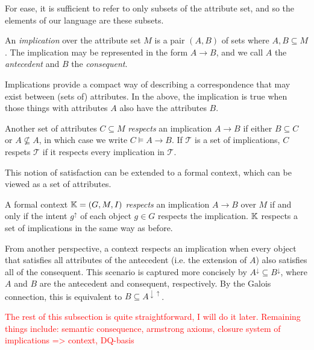 For ease, it is sufficient to refer to only subsets of the attribute set, and so the elements of our language are these subsets.

\begin{definition}
	\label{definition:implication}

	An \emph{implication} over the attribute set $M$ is a pair $(A,B)$ of sets where $A,B \subseteq M$. The implication
	may be represented in the form $A \rightarrow B$, and we call $A$ the \emph{antecedent} and $B$ the \emph{consequent}.
\end{definition}

Implications provide a compact way of describing a correspondence that may exist between (sets of) attributes. In the above,
the implication is true when those things with attributes $A$ also have the attributes $B$.

\begin{definition}
	\label{definition:implication-respect} Another set of attributes $C \subseteq M$ \emph{respects} an implication
	$A\rightarrow B$ if either $B \subseteq C$ or $A \not \subseteq A$, in which case we write $C \vDash A \rightarrow B$.
	If $\mathcal{T}$ is a set of implications, $C$ respets $\mathcal{T}$ if it respects every implication in $\mathcal{T}$.
\end{definition}

This notion of satisfaction can be extended to a formal context, which can be viewed as a set of attributes.

\begin{definition}
	\label{definition:implication-respect-context}

	A formal context $\mathbb{K} = (G,M,\mathrel{I})$ \emph{respects} an implication $A \rightarrow B$ over $M$ if and only if the intent
	$g^{\uparrow}$ of each object $g \in G$ respects the implication. $\mathbb{K}$ respects a set of implications in the
	same way as before.
\end{definition}

From another perspective, a context respects an implication when every object that satisfies all attributes of the
antecedent (i.e. the extension of $A$) also satisfies all of the consequent. This scenario is captured more concisely by
$A^{\downarrow}\subseteq B^{\downarrow}$, where $A$ and $B$ are the antecedent and consequent, respectively. By the Galois
connection, this is equivalent to $B \subseteq A^{\downarrow \uparrow}$.

\textcolor{red}{The rest of this subsection is quite straightforward, I will do it later. Remaining things include: semantic
consequence, armstrong axioms, closure system of implications => context, DQ-basis}

